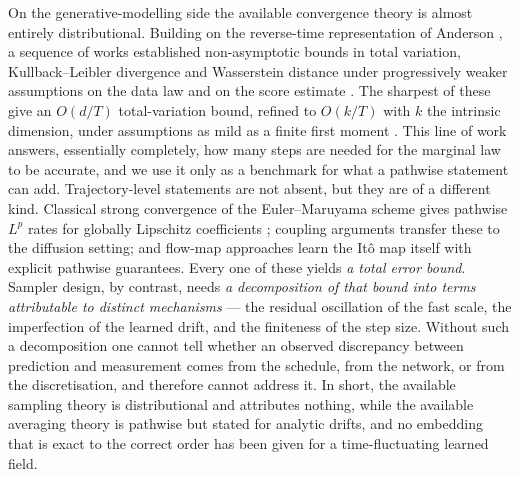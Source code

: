 \documentclass[a4paper,fleqn]{cas-dc}
\theoremstyle{definition}
\begin{document}
On the generative-modelling side the available convergence theory is almost entirely
distributional. Building on the reverse-time representation of Anderson
\cite{anderson1982}, a sequence of works established non-asymptotic bounds in total
variation, Kullback--Leibler divergence and Wasserstein distance under progressively
weaker assumptions on the data law and on the score estimate
\citep{block2020,lee2023convergence,chen2023sampling,debortoli2022,benton2024linear,
li2025odt}. The sharpest of these give an $O(d/T)$ total-variation bound, refined to
$O(k/T)$ with $k$ the intrinsic dimension, under assumptions as mild as a finite first
moment \citep{li2025odt}. This line of work answers, essentially completely, how many
steps are needed for the marginal law to be accurate, and we use it only as a
benchmark for what a pathwise statement can add. Trajectory-level statements are not
absent, but they are of a different kind. Classical strong convergence of the
Euler--Maruyama scheme gives pathwise $L^{p}$ rates for globally Lipschitz
coefficients \citep{kloeden1992,milstein1995,higham2001}; coupling arguments transfer
these to the diffusion setting; and flow-map approaches learn the It\^o map itself
with explicit pathwise guarantees. Every one of these yields \emph{a total error
bound}. Sampler design, by contrast, needs \emph{a decomposition of that bound into
terms attributable to distinct mechanisms} --- the residual oscillation of the fast
scale, the imperfection of the learned drift, and the finiteness of the step size.
Without such a decomposition one cannot tell whether an observed discrepancy between
prediction and measurement comes from the schedule, from the network, or from the
discretisation, and therefore cannot address it. In short, the available
sampling theory is distributional and attributes nothing, while the available
averaging theory is pathwise but stated for analytic drifts, and no embedding that is
exact to the correct order has been given for a time-fluctuating learned field.
\end{document}
